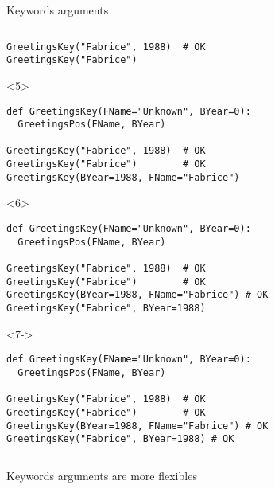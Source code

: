 \begin{frame}[fragile]{Keywords arguments}
\begin{columns}[onlytextwidth]
\begin{column}{\textwidth}
\begin{onlyenv}
\begin{lstlisting}[style=python]
GreetingsKey("Fabrice", 1988)  # OK
GreetingsKey("Fabrice")

 \end{lstlisting}
      \end{onlyenv}

      \begin{onlyenv}<5>
        \begin{lstlisting}[style=python]
def GreetingsKey(FName="Unknown", BYear=0):
  GreetingsPos(FName, BYear)

GreetingsKey("Fabrice", 1988)  # OK
GreetingsKey("Fabrice")        # OK
GreetingsKey(BYear=1988, FName="Fabrice")
 \end{lstlisting}
      \end{onlyenv}

      \begin{onlyenv}<6>
        \begin{lstlisting}[style=python]
def GreetingsKey(FName="Unknown", BYear=0):
  GreetingsPos(FName, BYear)

GreetingsKey("Fabrice", 1988)  # OK
GreetingsKey("Fabrice")        # OK
GreetingsKey(BYear=1988, FName="Fabrice") # OK
GreetingsKey("Fabrice", BYear=1988) \end{lstlisting}
      \end{onlyenv}

      \begin{onlyenv}<7->
        \begin{lstlisting}[style=python]
def GreetingsKey(FName="Unknown", BYear=0):
  GreetingsPos(FName, BYear)

GreetingsKey("Fabrice", 1988)  # OK
GreetingsKey("Fabrice")        # OK
GreetingsKey(BYear=1988, FName="Fabrice") # OK
GreetingsKey("Fabrice", BYear=1988) # OK \end{lstlisting}
      \end{onlyenv}

    \end{column}
  \end{columns}

   Keywords arguments are more flexibles

\end{frame}


